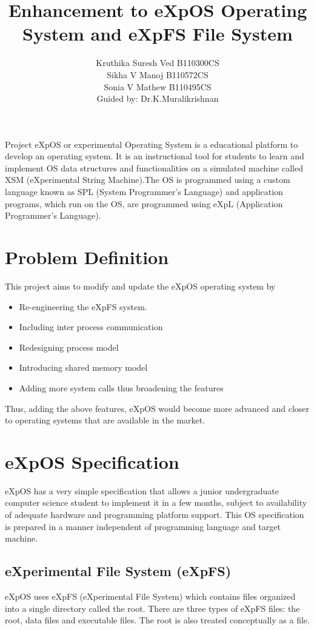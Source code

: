 \documentclass[10pt]{article}
\title{Enhancement to eXpOS Operating System and eXpFS File System}
\author{ Kruthika Suresh Ved     B110300CS\\  Sikha V Manoj     B110572CS\\  Sonia V Mathew    B110495CS\\ Guided by: Dr.K.Muralikrishnan}
\begin{document}
	
\maketitle
	

\abstract{} 
Project eXpOS or experimental Operating System is a educational platform to develop an operating system. It is an instructional tool for students to learn and implement OS data structures and functionalities on a simulated machine called XSM (eXperimental String Machine).The OS is programmed using a custom language known as SPL (System Programmer's Language) and application programs, which run on the OS, are programmed using eXpL (Application Programmer's Language).


\section{Problem Definition}
This project aims to modify and update the eXpOS operating system by
\begin{itemize}
\item Re-engineering the eXpFS system. 
\item Including inter process communication
\item Redesigning process model 
\item Introducing shared memory model 
\item Adding more system calls thus broadening the features
\end {itemize}
Thus, adding the above features, eXpOS would become more advanced and closer to operating systems that are available in the market.
\section{eXpOS Specification}
eXpOS has a very simple specification that allows a junior undergraduate computer science student to implement it in a few months, subject to availability of adequate hardware and programming platform support. This OS specification is prepared in a manner independent of programming language and target machine.
\subsection{eXperimental File System (eXpFS)}
eXpOS uses eXpFS (eXperimental File System) which contains files organized into a single directory called the root. There are three types of eXpFS files: the root, data files and executable files. The root is also treated conceptually as a file.
\end{document}
